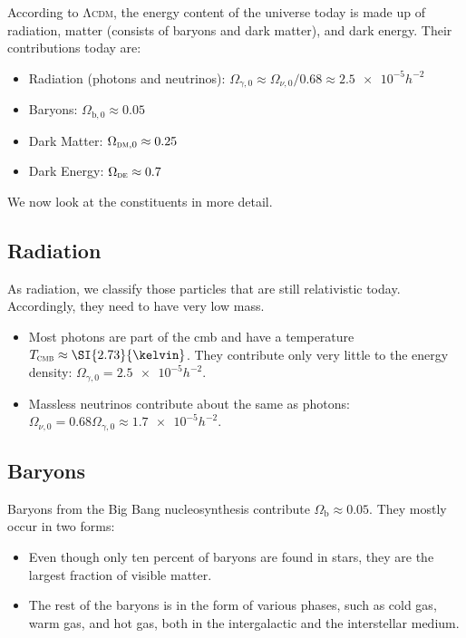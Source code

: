 According to \textsc{Λcdm}, the energy content of the universe today is made up of radiation, matter (consists of baryons and dark matter), and dark energy.
Their contributions today are:
\begin{itemize}[noitemsep, nolistsep]
	\item Radiation (photons and neutrinos): $\Omega_{\gamma,0} \approx \Omega_{\nu,0}/0.68 \approx \num{2.5e-5} h^{-2}$
	\item Baryons: $\Omega_{\text{b},0} \approx 0.05$
	\item Dark Matter: $\Omega_{\textsc{dm},0} \approx 0.25$
	\item Dark Energy: $\Omega_\textsc{de} \approx 0.7$
\end{itemize}
We now look at the constituents in more detail.

\subsection*{Radiation}

As radiation, we classify those particles that are still relativistic today. Accordingly, they need to have very low mass.
\begin{itemize}
	\item Most photons are part of the \ac{cmb} and have a temperature $T_\textsc{cmb} \approx \SI{2.73}{\kelvin}$. They contribute only very little to the energy density: $\Omega_{\gamma,0} = \num{2.5e-5} h^{-2}$.
	\item Massless neutrinos contribute about the same as photons: $\Omega_{\nu,0} = 0.68 \Omega_{\gamma,0} \approx \num{1.7e-5} h^{-2}$.
\end{itemize}

\subsection*{Baryons}
Baryons from the Big Bang nucleosynthesis contribute $\Omega_\text{b} \approx 0.05$. They mostly occur in two forms:
\begin{itemize}
	\item Even though only ten percent of baryons are found in stars, they are the largest fraction of visible matter.
	\item The rest of the baryons is in the form of various phases, such as cold gas, warm gas, and hot gas, both in the intergalactic and the interstellar medium.
\end{itemize}

